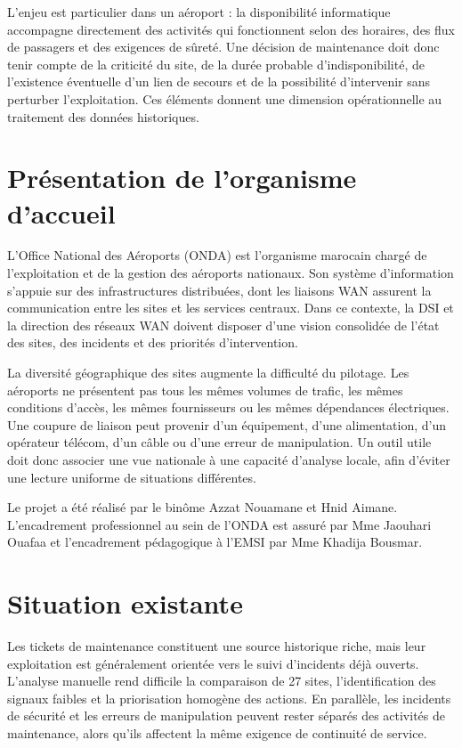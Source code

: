 \documentclass[12pt,a4paper,oneside]{report}
\begin{document}
L’enjeu est particulier dans un aéroport : la disponibilité informatique accompagne directement des activités qui fonctionnent selon des horaires, des flux de passagers et des exigences de sûreté. Une décision de maintenance doit donc tenir compte de la criticité du site, de la durée probable d’indisponibilité, de l’existence éventuelle d’un lien de secours et de la possibilité d’intervenir sans perturber l’exploitation. Ces éléments donnent une dimension opérationnelle au traitement des données historiques.

\section{Présentation de l’organisme d’accueil}

L’Office National des Aéroports (ONDA) est l’organisme marocain chargé de l’exploitation et de la gestion des aéroports nationaux. Son système d’information s’appuie sur des infrastructures distribuées, dont les liaisons WAN assurent la communication entre les sites et les services centraux. Dans ce contexte, la DSI et la direction des réseaux WAN doivent disposer d’une vision consolidée de l’état des sites, des incidents et des priorités d’intervention.

La diversité géographique des sites augmente la difficulté du pilotage. Les aéroports ne présentent pas tous les mêmes volumes de trafic, les mêmes conditions d’accès, les mêmes fournisseurs ou les mêmes dépendances électriques. Une coupure de liaison peut provenir d’un équipement, d’une alimentation, d’un opérateur télécom, d’un câble ou d’une erreur de manipulation. Un outil utile doit donc associer une vue nationale à une capacité d’analyse locale, afin d’éviter une lecture uniforme de situations différentes.

Le projet a été réalisé par le binôme Azzat Nouamane et Hnid Aimane. L’encadrement professionnel au sein de l’ONDA est assuré par Mme Jaouhari Ouafaa et l’encadrement pédagogique à l’EMSI par Mme Khadija Bousmar.

\section{Situation existante}

Les tickets de maintenance constituent une source historique riche, mais leur exploitation est généralement orientée vers le suivi d’incidents déjà ouverts. L’analyse manuelle rend difficile la comparaison de 27 sites, l’identification des signaux faibles et la priorisation homogène des actions. En parallèle, les incidents de sécurité et les erreurs de manipulation peuvent rester séparés des activités de maintenance, alors qu’ils affectent la même exigence de continuité de service.
\end{document}
